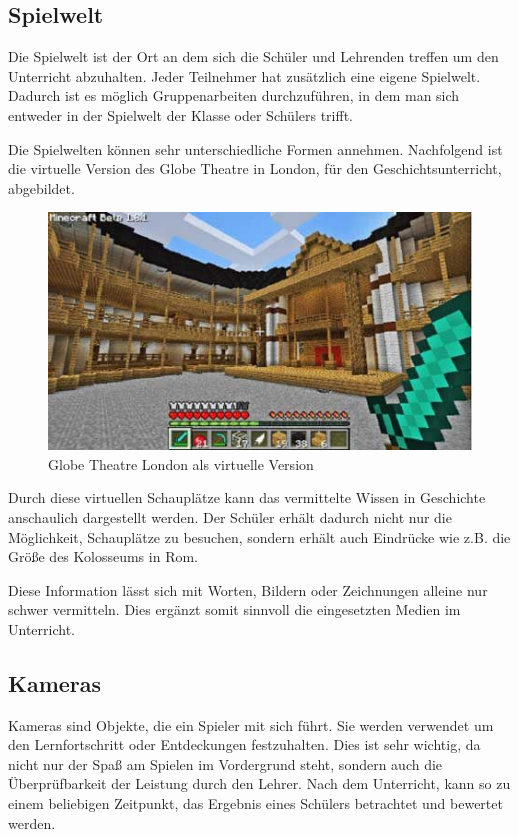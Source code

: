 \subsection{Spielwelt}
Die Spielwelt ist der Ort an dem sich die Schüler und Lehrenden treffen um den Unterricht abzuhalten. Jeder Teilnehmer hat zusätzlich eine eigene Spielwelt. Dadurch ist es möglich Gruppenarbeiten durchzuführen, in dem man sich entweder in der Spielwelt der Klasse oder Schülers trifft.

Die Spielwelten können sehr unterschiedliche Formen annehmen. Nachfolgend ist die virtuelle Version des Globe Theatre in London, für den Geschichtsunterricht, abgebildet.

\begin{figure}[ht]
	\centering
	\includegraphics[width=\textwidth,height=\textheight,keepaspectratio]{images/GlobeTheatreLondon.png}
	\caption{Globe Theatre London als virtuelle Version \cite{EdutopiaIdeas}}
	\label{globeTheatreLondon}
\end{figure}

Durch diese virtuellen Schauplätze kann das vermittelte Wissen in Geschichte anschaulich dargestellt werden. Der Schüler erhält dadurch nicht nur die Möglichkeit, Schauplätze zu besuchen, sondern erhält auch Eindrücke wie z.B. die Größe des Kolosseums in Rom. \cite{EdutopiaIdeas}

Diese Information lässt sich mit Worten, Bildern oder Zeichnungen alleine nur schwer vermitteln. Dies ergänzt somit sinnvoll die eingesetzten Medien im Unterricht.

\subsection{Kameras}
Kameras sind Objekte, die ein Spieler mit sich führt. Sie werden verwendet um den Lernfortschritt oder Entdeckungen festzuhalten. Dies ist sehr wichtig, da nicht nur der Spaß am Spielen im Vordergrund steht, sondern auch die Überprüfbarkeit der Leistung durch den Lehrer. Nach dem Unterricht, kann so zu einem beliebigen Zeitpunkt, das Ergebnis eines Schülers betrachtet und bewertet werden.

